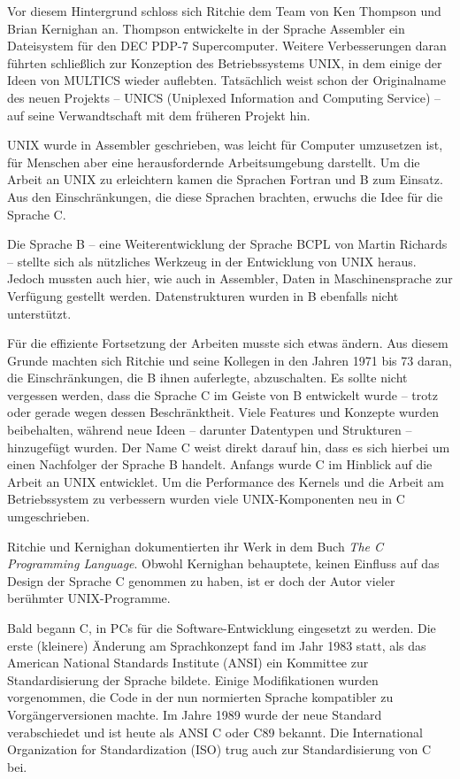 \begin{appendices}
Vor diesem Hintergrund schloss sich Ritchie dem Team von Ken Thompson und Brian Kernighan an. Thompson entwickelte in der Sprache Assembler ein Dateisystem für den DEC PDP-7 Supercomputer. Weitere Verbesserungen daran führten schließlich zur Konzeption des Betriebssystems UNIX, in dem einige der Ideen von MULTICS wieder auflebten. Tatsächlich weist schon der Originalname des neuen Projekts -- UNICS (Uniplexed Information and Computing Service) -- auf seine Verwandtschaft mit dem früheren Projekt hin.

UNIX wurde in Assembler geschrieben, was leicht für Computer umzusetzen ist, für Menschen aber eine herausfordernde Arbeitsumgebung darstellt. Um die Arbeit an UNIX zu erleichtern kamen die Sprachen Fortran und B zum Einsatz. Aus den Einschränkungen, die diese Sprachen brachten, erwuchs die Idee für die Sprache C.

Die Sprache B -- eine Weiterentwicklung der Sprache BCPL von Martin Richards -- stellte sich als nützliches Werkzeug in der Entwicklung von UNIX heraus. Jedoch mussten auch hier, wie auch in Assembler, Daten in Maschinensprache zur Verfügung gestellt werden. Datenstrukturen wurden in B ebenfalls nicht unterstützt.

Für die effiziente Fortsetzung der Arbeiten musste sich etwas ändern. Aus diesem Grunde machten sich Ritchie und seine Kollegen in den Jahren 1971 bis 73 daran, die Einschränkungen, die B ihnen auferlegte, abzuschalten. Es sollte nicht vergessen werden, dass die Sprache C im Geiste von B entwickelt wurde -- trotz oder gerade wegen dessen Beschränktheit. Viele Features und Konzepte wurden beibehalten, während neue Ideen -- darunter Datentypen und Strukturen -- hinzugefügt wurden. Der Name C weist direkt darauf hin, dass es sich hierbei um einen Nachfolger der Sprache B handelt. Anfangs wurde C im Hinblick auf die Arbeit an UNIX entwicklet. Um die Performance des Kernels und die Arbeit am Betriebssystem zu verbessern wurden viele UNIX-Komponenten neu in C umgeschrieben.

Ritchie und Kernighan dokumentierten ihr Werk in dem Buch \emph{The C Programming Language}. Obwohl Kernighan behauptete, keinen Einfluss auf das Design der Sprache C genommen zu haben, ist er doch der Autor vieler berühmter UNIX-Programme.

Bald begann C, in PCs für die Software-Entwicklung eingesetzt zu werden. Die erste (kleinere) Änderung am Sprachkonzept fand im Jahr 1983 statt, als das American National Standards Institute (ANSI) ein Kommittee zur Standardisierung der Sprache bildete. Einige Modifikationen wurden vorgenommen, die Code in der nun normierten Sprache kompatibler zu Vorgängerversionen machte. Im Jahre 1989 wurde der neue Standard verabschiedet und ist heute als ANSI C oder C89 bekannt. Die International Organization for Standardization (ISO) trug auch zur Standardisierung von C bei.


\end{appendices}
